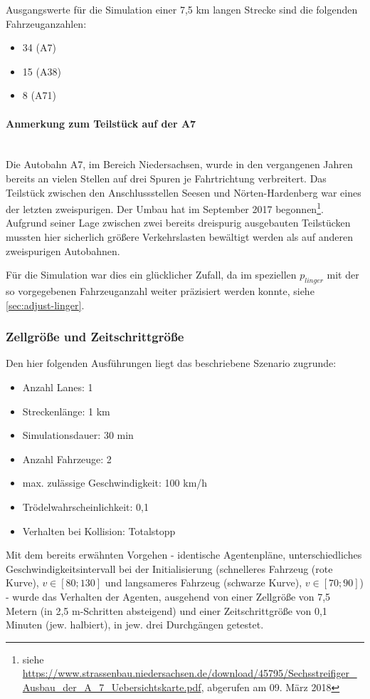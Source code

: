 Ausgangswerte für die Simulation einer 7,5 km langen Strecke sind die folgenden Fahrzeuganzahlen: 
\begin{itemize}
	\itemsep0em
	\item 34 (A7)
	\item 15 (A38)
	\item 8 (A71)
\end{itemize}

\paragraph*{Anmerkung zum Teilstück auf der A7}
\hfill \\
Die Autobahn A7, im Bereich Niedersachsen, wurde in den vergangenen Jahren bereits an vielen Stellen auf drei Spuren je Fahrtrichtung verbreitert.
Das Teilstück zwischen den Anschlussstellen Seesen und Nörten-Hardenberg war eines der letzten zweispurigen.
Der Umbau hat im September 2017 begonnen\footnote{siehe \url{https://www.strassenbau.niedersachsen.de/download/45795/Sechsstreifiger_Ausbau_der_A_7_Uebersichtskarte.pdf}, abgerufen am 09. März 2018}.
Aufgrund seiner Lage zwischen zwei bereits dreispurig ausgebauten Teilstücken mussten hier sicherlich größere Verkehrslasten bewältigt werden als auf anderen zweispurigen Autobahnen.

Für die Simulation war dies ein glücklicher Zufall, da im speziellen $p_{linger}$ mit der so vorgegebenen Fahrzeuganzahl weiter präzisiert werden konnte, siehe \cref{sec:adjust-linger}.



\subsubsection{Zellgröße und Zeitschrittgröße}
\label{sec:cellsize-timesteplength}

Den hier folgenden Ausführungen liegt das beschriebene Szenario zugrunde:
\begin{itemize}
\itemsep0em
	\item Anzahl Lanes: 1
	\item Streckenlänge: 1 km
	\item Simulationsdauer: 30 min
	\item Anzahl Fahrzeuge: 2
	\item max. zulässige Geschwindigkeit: 100 km/h
	\item Trödelwahrscheinlichkeit: 0,1
	\item Verhalten bei Kollision: Totalstopp
\end{itemize}
Mit dem bereits erwähnten Vorgehen - identische Agentenpläne, unterschiedliches Geschwindigkeitsintervall bei der Initialisierung (schnelleres Fahrzeug (rote Kurve), $ v \in [80; 130] $ und langsameres Fahrzeug (schwarze Kurve), $ v \in [70; 90] $) - wurde das Verhalten der Agenten, ausgehend von einer Zellgröße von 7,5 Metern (in 2,5 m-Schritten absteigend) und einer Zeitschrittgröße von 0,1 Minuten (jew. halbiert), in jew. drei Durchgängen getestet.

